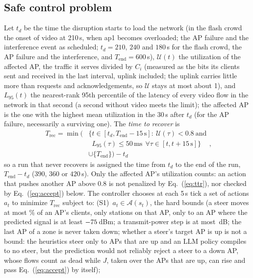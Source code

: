 \documentclass[conference]{IEEEtran}
\begin{document}
\subsection{Safe control problem}
Let $t_d$ be the time the disruption starts to load the network (in the flash crowd the onset of video at 210\,s, when ap1 becomes overloaded; the AP failure and the interference event as scheduled; $t_d=210$, $240$ and $180$\,s for the flash crowd, the AP failure and the interference, and $T_{\mathrm{end}}=600$\,s), $\mathcal U(t)$ the utilization of the affected AP, the traffic it serves divided by $C_i$ (measured as the bits its clients sent and received in the last interval, uplink included; the uplink carries little more than requests and acknowledgements, so $\mathcal U$ stays at most about 1), and $L_{95}(t)$ the nearest-rank 95th percentile of the latency of every video flow in the network in that second (a second without video meets the limit); the affected AP is the one with the highest mean utilization in the 30\,s after $t_d$ (for the AP failure, necessarily a surviving one). The \emph{time to recover} is
\begin{equation}
\boxed{\begin{aligned}
T_{\mathrm{rec}}=\min\big(&\{t\in[t_d,T_{\mathrm{end}}-15\,\mathrm{s}]:\ \mathcal U(\tau)<0.8\ \text{and}\\
&\phantom{\{}L_{95}(\tau)\le 50\,\mathrm{ms}\ \ \forall\tau\in[t,t+15\,\mathrm{s}]\}\\
&\cup\{T_{\mathrm{end}}\}\big)-t_d
\end{aligned}},
\label{eq:ttr}
\end{equation}
so a run that never recovers is assigned the time from $t_d$ to the end of the run, $T_{\mathrm{end}}-t_d$ ($390$, $360$ or $420$\,s). Only the affected AP's utilization counts: an action that pushes another AP above 0.8 is not penalized by Eq.~(\ref{eq:ttr}), nor checked by Eq.~(\ref{eq:accept}) below.
The controller chooses at each 5\,s tick a set of actions $a_t$ to minimize $T_{\mathrm{rec}}$ subject to:
(S1)~$a_t\in\mathcal A(s_t)$, the hard bounds (a steer moves at most \CfgMaxSteerPct\% of an AP's clients, only stations on that AP, only to an AP where the predicted signal is at least $-75$\,dBm; a transmit-power step is at most \CfgTxStep\,dB; the last AP of a zone is never taken down; whether a steer's target AP is up is not a bound: the heuristics steer only to APs that are up and an LLM policy compiles to no steer, but the prediction would not reliably reject a steer to a down AP, whose flows count as dead while $J$, taken over the APs that are up, can rise and pass Eq.~(\ref{eq:accept}) by itself);
\end{document}
